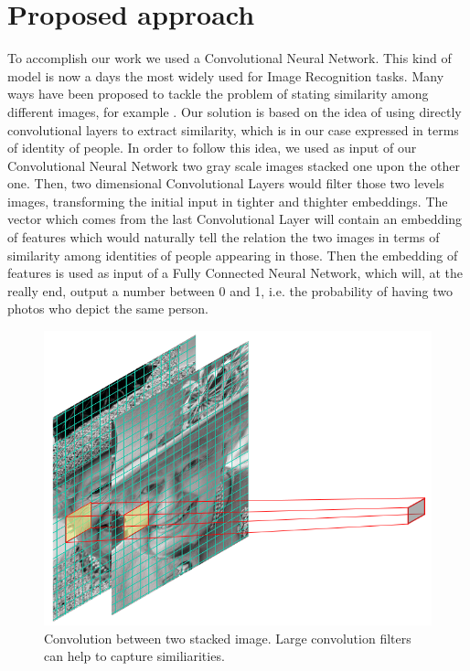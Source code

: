 \section{Proposed approach}
To accomplish our work we used a Convolutional Neural Network. This kind of model is now a days the most widely used for Image Recognition tasks. Many ways have been proposed to tackle the problem of stating similarity among different images, for example . Our solution is based on the idea of using directly convolutional layers to extract similarity, which is in our case expressed in terms of identity of people. In order to follow this idea, we used as input of our Convolutional Neural Network two gray scale images stacked one upon the other one. Then, two dimensional Convolutional Layers would filter those two levels images, transforming the initial input in tighter and thighter embeddings. The vector which comes from the last Convolutional Layer will contain an embedding of features which would naturally tell the relation the two images in terms of similarity among identities of people appearing in those. Then the embedding of features is used as input of a Fully Connected Neural Network, which will, at the really end, output a number between 0 and 1, i.e. the probability of having two photos who depict the same person.

\begin{figure}[t]
\includegraphics[width=0.8\linewidth]{images/stackedconvolution.png}
   \caption{Convolution between two stacked image. Large convolution filters can help to capture similiarities.}
\label{fig:long}
\label{fig:onecol}
\end{figure}

